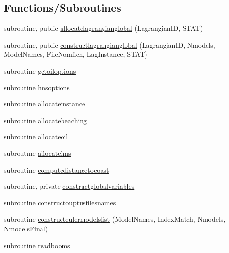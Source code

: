 \subsection*{Functions/\+Subroutines}
\begin{DoxyCompactItemize}
\item 
subroutine, public \mbox{\hyperlink{namespacemodulelagrangianglobal_a8ae3b3566ebe3cc057810473a03a4abf}{allocatelagrangianglobal}} (Lagrangian\+ID, S\+T\+AT)
\item 
subroutine, public \mbox{\hyperlink{namespacemodulelagrangianglobal_a19213baf32d688585211b786d897cd69}{constructlagrangianglobal}} (Lagrangian\+ID, Nmodels, Model\+Names, File\+Nomfich, Lag\+Instance, S\+T\+AT)
\item 
subroutine \mbox{\hyperlink{namespacemodulelagrangianglobal_a64f08b972c519197b497942c12d54fd5}{getoiloptions}}
\item 
subroutine \mbox{\hyperlink{namespacemodulelagrangianglobal_a262f7ae29a62989ca338ab8fa6acca79}{hnsoptions}}
\item 
subroutine \mbox{\hyperlink{namespacemodulelagrangianglobal_abce203684794c35638261e5dc08eae81}{allocateinstance}}
\item 
subroutine \mbox{\hyperlink{namespacemodulelagrangianglobal_a48e2f7f1b1f2612fb2b891f9ae7918b4}{allocatebeaching}}
\item 
subroutine \mbox{\hyperlink{namespacemodulelagrangianglobal_a0be041be04e7755f84bc26f6dfe301b0}{allocateoil}}
\item 
subroutine \mbox{\hyperlink{namespacemodulelagrangianglobal_aa4f2e4611a6f55063b6b425e9af734c9}{allocatehns}}
\item 
subroutine \mbox{\hyperlink{namespacemodulelagrangianglobal_ae26f6cb369947b236a6e8dffcbed3eb2}{computedistancetocoast}}
\item 
subroutine, private \mbox{\hyperlink{namespacemodulelagrangianglobal_ac07ce699fa5190e37b220b344450ba80}{constructglobalvariables}}
\item 
subroutine \mbox{\hyperlink{namespacemodulelagrangianglobal_a083836de958c69614f913a7f1b0bee9e}{constructouptusfilesnames}}
\item 
subroutine \mbox{\hyperlink{namespacemodulelagrangianglobal_a409542d48e7b2b20840dc3545d1a34f0}{constructeulermodelslist}} (Model\+Names, Index\+Match, Nmodels, Nmodels\+Final)
\item 
subroutine \mbox{\hyperlink{namespacemodulelagrangianglobal_ae6c369ad79b4c62328e4792cd7aed791}{readbooms}}
\item 

\end{DoxyCompactItemize}
